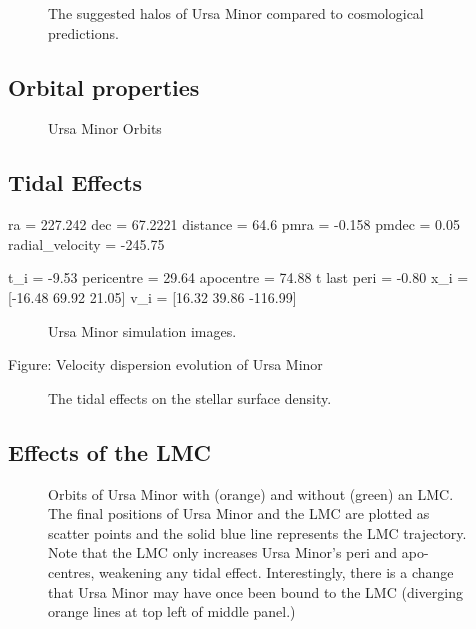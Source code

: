 \begin{figure}
\centering
{}
\caption[Ursa Minor initial halos]{The suggested halos of Ursa Minor
compared to cosmological predictions.}
\end{figure}

\subsection{Orbital properties}\label{orbital-properties-1}

\begin{figure}
\centering
{}
\caption{Ursa Minor Orbits}
\end{figure}

\subsection{Tidal Effects}\label{tidal-effects-2}

ra = 227.242 dec = 67.2221 distance = 64.6 pmra = -0.158 pmdec = 0.05
radial\_velocity = -245.75

t\_i = -9.53 pericentre = 29.64 apocentre = 74.88 t last peri = -0.80
x\_i = {[}-16.48 69.92 21.05{]} v\_i = {[}16.32 39.86 -116.99{]}

\begin{figure}
\centering
{}
\caption[Ursa Minor simulation snapshots]{Ursa Minor simulation images.}
\end{figure}

Figure: Velocity dispersion evolution of Ursa Minor

\begin{figure}
\centering
{}
\caption[Ursa Minor simulated density profiles]{The tidal effects on the
stellar surface density.}
\end{figure}

\subsection{Effects of the LMC}\label{effects-of-the-lmc-1}

\begin{figure}
\centering
{}
\caption[Ursa Minor orbits with LMC]{Orbits of Ursa Minor with (orange)
and without (green) an LMC. The final positions of Ursa Minor and the
LMC are plotted as scatter points and the solid blue line represents the
LMC trajectory. Note that the LMC only increases Ursa Minor's peri and
apo-centres, weakening any tidal effect. Interestingly, there is a
change that Ursa Minor may have once been bound to the LMC (diverging
orange lines at top left of middle panel.)}
\end{figure}

